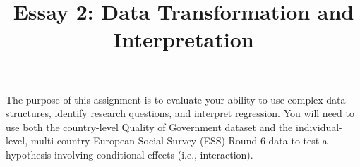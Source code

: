 \documentclass[a4paper,11pt]{article}
\title{Essay 2: Data Transformation and Interpretation}
\author{}
\date{}
\begin{document}
\maketitle

\vspace{-3em}


\vspace{1em}

\noindent The purpose of this assignment is to evaluate your ability to use complex data structures, identify research questions, and interpret regression. You will need to use both the country-level Quality of Government dataset and the individual-level, multi-country European Social Survey (ESS) Round 6 data to test a hypothesis involving conditional effects (i.e., interaction).

\vspace{1em}
\end{document}

